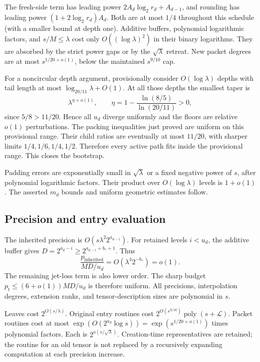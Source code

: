 \documentclass[11pt,letterpaper]{article}
\theoremstyle{remark}\newtheorem{remark}[theorem]{Remark}
\newcommand{\poly}{\operatorname{poly}}
\begin{document}
The fresh-side term has leading power $2A_d\log_2r_d+A_{d-1}$, and
rounding has leading power $(1+2\log_2r_d)A_d$. Both are at most $1/4$
throughout this schedule (with a smaller bound at depth one). Additive
buffers, polynomial logarithmic factors, and $s/M\le\lambda$ cost only
$O((\log\lambda)^2)$ in their binary logarithms. They are absorbed by
the strict power gaps or by the $\sqrt\lambda$ retreat. New packet
degrees are at most $s^{1/20+o(1)}$, below the maintained $s^{9/10}$ cap.

For a noncircular depth argument, provisionally consider
$O(\log\lambda)$ depths with tail length at most
$\log_{20/11}\lambda+O(1)$. At all those depths the smallest taper is
\[
 \lambda^{\eta+o(1)},\qquad
 \eta=1-\frac{\ln(8/5)}{\ln(20/11)}>0,
\]
since $5/8>11/20$. Hence all $u_d$ diverge uniformly and the floors are
relative $o(1)$ perturbations. The packing inequalities just proved are
uniform on this provisional range. Their child ratios are eventually at
most $11/20$, with sharper limits $1/4,1/6,1/4,1/2$. Therefore every active
path fits inside the provisional range. This closes the bootstrap.

Padding errors are exponentially small in $\sqrt\lambda$ or a fixed
negative power of $s$, after polynomial logarithmic factors. Their product
over $O(\log\lambda)$ levels is $1+o(1)$. The asserted $m_d$ bounds and
uniform geometric estimates follow.

\subsection{Precision and entry evaluation}

The inherited precision is $O(s\lambda^2 2^{a_{d-1}})$. For retained levels
$i<u_d$, the additive buffer gives
$D=2^{a_d-i}\ge2^{a_{d-1}+b_*+1}$. Thus
\[
 \frac{p_{\mathrm{inherited}}}{MD/u_d}
 =O(\lambda^4 2^{-b_*})=o(1).
\]
The remaining jet-loss term is also lower order. The sharp budget
$p_t\le(6+o(1))MD/u_d$ is therefore uniform. All precisions,
interpolation degrees, extension ranks, and tensor-description sizes are
polynomial in $s$.

Leaves cost $2^{O(s/\lambda)}$. Original entry routines cost
$2^{O(s^{9/10})}\poly(s+\mathcal L)$. Packet routines cost at most
$\exp(O(2^{a_d}\log s))=\exp(s^{1/20+o(1)})$ times polynomial factors.
Each is $2^{o(s/\sqrt\lambda)}$. Creation-time representatives are retained;
the routine for an old tensor is not replaced by a recursively expanding
computation at each precision increase.
\end{document}
